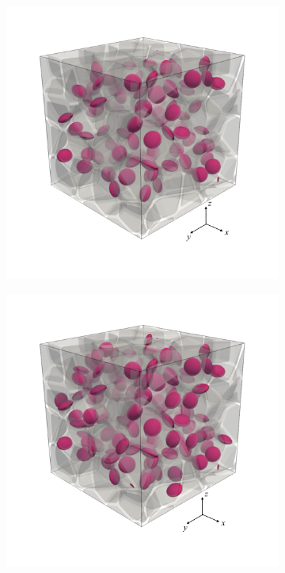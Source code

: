 \begin{figure}[!htb]
\begin{subfigure}{0.32\textwidth}
    \includegraphics[width=\textwidth]{Chapter3/figures/b100_ini_new}
    \caption{}
    \label{b100_ini}
  \end{subfigure}
  \begin{subfigure}{0.32\textwidth}
    \centering
    \includegraphics[width=\textwidth]{Chapter3/figures/b150_ini_new}

\end{subfigure}
\end{figure}
